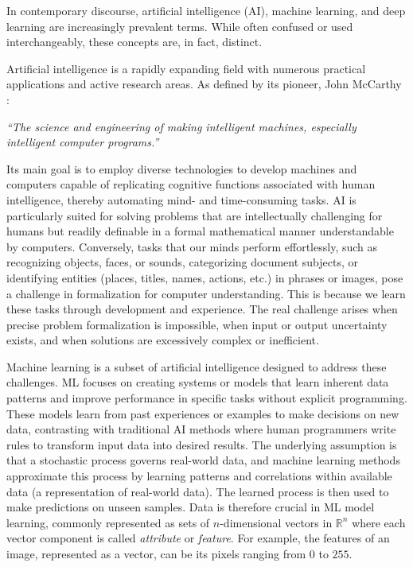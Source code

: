 In contemporary discourse, artificial intelligence (\acs{AI}), machine learning, and deep learning are increasingly prevalent terms. While often confused or used interchangeably, these concepts are, in fact, distinct.

Artificial intelligence is a rapidly expanding field with numerous practical applications and active research areas. As defined by its pioneer, John McCarthy \cite{mccarthy2004artificial}:
\begin{center}
	\itshape
	``The science and engineering of making intelligent machines, especially intelligent computer programs.''
\end{center}
Its main goal is to employ diverse technologies to develop machines and computers capable of replicating cognitive functions associated with human intelligence, thereby automating mind- and time-consuming tasks. \acs{AI} is particularly suited for solving problems that are intellectually challenging for humans but readily definable in a formal mathematical manner understandable by computers. Conversely, tasks that our minds perform effortlessly, such as recognizing objects, faces, or sounds, categorizing document subjects, or identifying entities (places, titles, names, actions, etc.) in phrases or images, pose a challenge in formalization for computer understanding. This is because we learn these tasks through development and experience. The real challenge arises when precise problem formalization is impossible, when input or output uncertainty exists, and when solutions are excessively complex or inefficient.

Machine learning is a subset of artificial intelligence designed to address these challenges. \acs{ML} focuses on creating systems or models that learn inherent data patterns and improve performance in specific tasks without explicit programming. These models learn from past experiences or examples to make decisions on new data, contrasting with traditional AI methods where human programmers write rules to transform input data into desired results. The underlying assumption is that a stochastic process governs real-world data, and machine learning methods approximate this process by learning patterns and correlations within available data (a representation of real-world data). The learned process is then used to make predictions on unseen samples. Data is therefore crucial in \acs{ML} model learning, commonly represented as sets of $n$-dimensional vectors in $\mathbb{R}^n$ where each vector component is called \emph{attribute} or \emph{feature}. For example, the features of an image, represented as a vector, can be its pixels ranging from $0$ to $255$.

